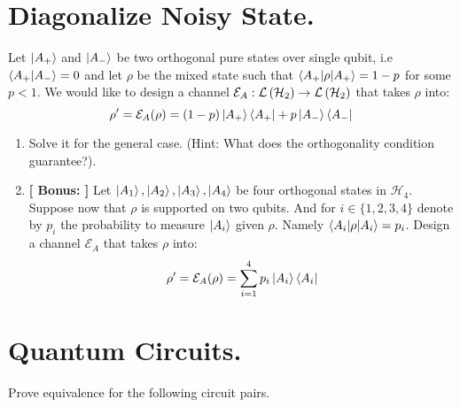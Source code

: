 \documentclass[12pt,a4paper]{article}
\begin{document}
\section{Diagonalize Noisy State.}
Let $\ket{A_{+}}$ and $\ket{A_{-}}$ be two orthogonal pure states over single qubit, i.e $\braket{A_{+} | A_{-}} = 0$ and let $\rho$ be the mixed state such that $\braket{A_{+}|\rho|A_{+}}  = 1 -p$ for some $p<1$. We would like to design a channel $\mathcal{E}_{A}: \mathcal{L}\left( \mathcal{H}_{2} \right) \rightarrow \mathcal{L}\left( \mathcal{H}_{2} \right) $ that takes $\rho$ into:
    $$\rho^\prime = \mathcal{E}_{A}(\rho) = (1-p)\ket{A_{+}}\bra{A_{+}} + p\ket{A_{-}}\bra{A_{-}}$$ 
\begin{enumerate} 
    \item Solve it for the general case. (Hint: What does the orthogonality condition guarantee?). 
    \item \textbf{[ Bonus: ]} Let $\ket{A_1},\ket{A_2},\ket{A_3}, \ket{A_{4}}$ be four orthogonal states in $\mathcal{H}_{4}$. Suppose now that $\rho$ is supported on two qubits.  And for $i \in \{1,2,3,4\}$ denote by $p_{i}$ the probability to measure $\ket{A_i}$ given $\rho$. Namely $ \braket{A_i|\rho|A_i} = p_i$. Design a channel $\mathcal{E}_{A}$ that takes $\rho$ into:
    $$\rho^\prime = \mathcal{E}_{A}(\rho) =  \sum_{i=1}^{4}{p_{i}\ket{A_{i}}\bra{A_{i}}} $$  
\end{enumerate}

\section{Quantum Circuits.}
Prove equivalence for the following circuit pairs. 
\end{document}
